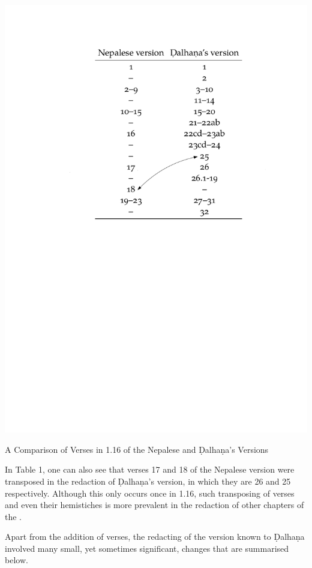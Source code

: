 \begin{table}
\centering
\includegraphics[draft=false,width=\textwidth]{table-of-versions.pdf}
\caption{A Comparison of Verses in 1.16 of the Nepalese and Ḍalhaṇa's Versions}
\end{table}

In Table 1, one can also see that verses 17 and 18 of the Nepalese version were transposed in the redaction of Ḍalhaṇa's version, in which they are 26 and 25 respectively. Although this only occurs once in 1.16, such transposing of verses and even their hemistiches is more prevalent in the redaction of other chapters of the \SS.

Apart from the addition of verses, the redacting of the version known to Ḍalhaṇa involved many small, yet sometimes significant, changes that are summarised below. 

